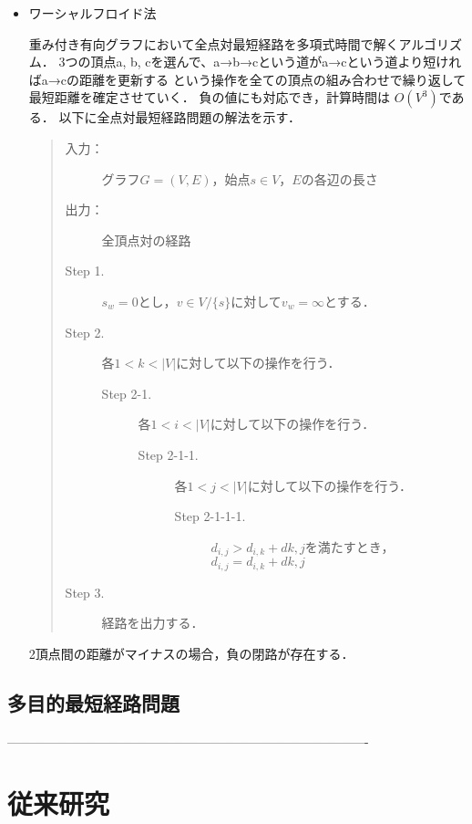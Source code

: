 \documentclass[12pt]{optlab-bachelor}
\begin{document}
\begin{itemize}
  \item ワーシャルフロイド法

  重み付き有向グラフにおいて全点対最短経路を多項式時間で解くアルゴリズム．
  3つの頂点a, b, cを選んで、a→b→cという道がa→cという道より短ければa→cの距離を更新する
  という操作を全ての頂点の組み合わせで繰り返して最短距離を確定させていく．
  負の値にも対応でき，計算時間は $O(V^3)$である．
  以下に全点対最短経路問題の解法を示す．

  \begin{quote}
    \begin{description}
      \item[入力：] グラフ$G=(V,E)$，始点$s \in V$，$E$の各辺の長さ
      \item[出力：] 全頂点対の経路
      \item[Step 1.] $s_w = 0$とし，$v \in V/\{s\}$に対して$v_w = \infty$とする．
      \item[Step 2.] 各$1<k<|V|$に対して以下の操作を行う．
      \begin{description}
        \item[Step 2-1.] 各$1<i<|V|$に対して以下の操作を行う．
        \begin{description}
          \item[Step 2-1-1.] 各$1<j<|V|$に対して以下の操作を行う．
          \begin{description}
            \item[Step 2-1-1-1.] $d_{i,j} > d_{i,k} + d{k,j}$を満たすとき，
            $d_{i,j} = d_{i,k} + d{k,j}$
          \end{description}
        \end{description}
      \end{description}

      \item[Step 3.] 経路を出力する．
    \end{description}
  \end{quote}
  2頂点間の距離がマイナスの場合，負の閉路が存在する．
\end{itemize}

\section{多目的最短経路問題}


-------------------------------------------------------------------------------------

\chapter{従来研究}
\end{document}

